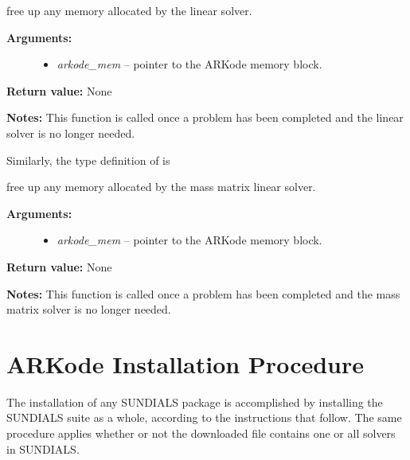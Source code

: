 \documentclass[letterpaper,10pt,english]{sphinxmanual}
\begin{document}
\begin{fulllineitems}
\label{linear_solvers/custom:c.lfree}
free up any memory allocated by the linear solver.
\begin{description}
\item[{\textbf{Arguments:}}] \leavevmode\begin{itemize}
\item {} 
\emph{arkode\_mem} -- pointer to the ARKode memory block.

\end{itemize}

\end{description}

\textbf{Return value:}  None

\textbf{Notes:}  This function is called once a problem has been
completed and the linear solver is no longer needed.

\end{fulllineitems}


Similarly, the type definition of {\hyperref[linear_solvers/custom:c.mfree]{\emph{}}} is

\begin{fulllineitems}
\label{linear_solvers/custom:c.mfree}
free up any memory allocated by the mass matrix linear solver.
\begin{description}
\item[{\textbf{Arguments:}}] \leavevmode\begin{itemize}
\item {} 
\emph{arkode\_mem} -- pointer to the ARKode memory block.

\end{itemize}

\end{description}

\textbf{Return value:}  None

\textbf{Notes:}  This function is called once a problem has been
completed and the mass matrix solver is no longer needed.

\end{fulllineitems}



\chapter{ARKode Installation Procedure}
\label{Install:installation}\label{Install:arkode-installation-procedure}\label{Install::doc}
The installation of any SUNDIALS package is accomplished by installing
the SUNDIALS suite as a whole, according to the instructions that
follow.  The same procedure applies whether or not the downloaded
file contains one or all solvers in SUNDIALS.
\end{document}
